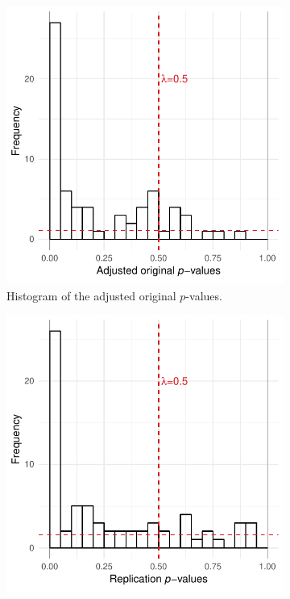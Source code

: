 \documentclass[11pt]{article}
\theoremstyle{definition}
\theoremstyle{custom}
\begin{document}
  \begin{figure}[htbp]
    \centering
    \begin{subfigure}[t]{0.49\hsize}
      \centering
      \includegraphics[width=\hsize]{fdp-original}
      \caption{Histogram of the adjusted original $p$-values.}
    \label{fig:fdp-original}
    \end{subfigure}
    \hfill
    \begin{subfigure}[t]{0.49\hsize}
      \centering
      \includegraphics[width=\hsize]{fdp-replication}

\end{subfigure}
\end{figure}
\end{document}
